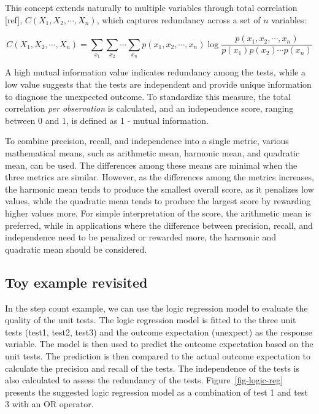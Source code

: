 \documentclass[
]{jds}
\begin{document}
This concept extends naturally to multiple variables through total
correlation {[}ref{]}, \(C(X_1, X_2, \cdots, X_n)\), which captures
redundancy across a set of \(n\) variables:

\[C(X_1, X_2, \cdots, X_n) = \sum_{x_1} \sum_{x_2} \cdots \sum_{x_n} p(x_1, x_2, \cdots, x_n) \log \frac{p(x_1, x_2, \cdots, x_n)}{p(x_1)p(x_2) \cdots p(x_n)}\]

A high mutual information value indicates redundancy among the tests,
while a low value suggests that the tests are independent and provide
unique information to diagnose the unexpected outcome. To standardize
this measure, the total correlation \emph{per observation} is
calculated, and an independence score, ranging between 0 and 1, is
defined as 1 - mutual information.

To combine precision, recall, and independence into a single metric,
various mathematical means, such as arithmetic mean, harmonic mean, and
quadratic mean, can be used. The differences among these means are
minimal when the three metrics are similar. However, as the differences
among the metrics increases, the harmonic mean tends to produce the
smallest overall score, as it penalizes low values, while the quadratic
mean tends to produce the largest score by rewarding higher values more.
For simple interpretation of the score, the arithmetic mean is
preferred, while in applications where the difference between precision,
recall, and independence need to be penalized or rewarded more, the
harmonic and quadratic mean should be considered.

\subsection{Toy example revisited}\label{toy-example-revisited}

In the step count example, we can use the logic regression model to
evaluate the quality of the unit tests. The logic regression model is
fitted to the three unit tests (test1, test2, test3) and the outcome
expectation (unexpect) as the response variable. The model is then used
to predict the outcome expectation based on the unit tests. The
prediction is then compared to the actual outcome expectation to
calculate the precision and recall of the tests. The independence of the
tests is also calculated to assess the redundancy of the tests.
Figure~\ref{fig-logic-reg} presents the suggested logic regression model
as a combination of test 1 and test 3 with an OR operator.
\end{document}
